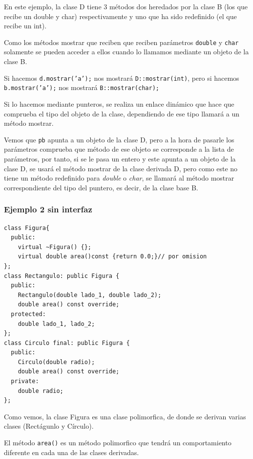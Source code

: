 En este ejemplo, la clase D tiene 3 métodos dos heredados por la clase B (los que recibe un double y char) respectivamente y uno que ha sido redefinido (el que recibe un int).

Como los métodos mostrar que reciben que reciben parámetros \texttt{double}  y \texttt{char} solamente se pueden acceder a ellos cuando lo llamamos mediante un objeto de la clase B.

Si hacemos \texttt{d.mostrar('a');} nos mostrará \texttt{D::mostrar(int)}, pero si hacemos \texttt{b.mostrar(’a’);} nos mostrará \texttt{B::mostrar(char);} 

Si lo hacemos mediante punteros, se realiza un enlace dinámico que hace que comprueba el tipo del objeto de la clase, dependiendo de ese tipo llamará a un método mostrar.

Vemos que \texttt{pb} apunta a un objeto de la clase D, pero a la hora de pasarle los parámetros comprueba que método de ese objeto se corresponde a la lista de parámetros, por tanto, si se le pasa un entero y este apunta a un objeto de la clase D, se usará el método mostrar de la clase derivada D, pero como este no tiene un método redefinido para \textit{double} o \textit{char}, se llamará al método mostrar correspondiente del tipo del puntero, es decir, de la clase base B.

\subsubsection{Ejemplo 2 sin interfaz}

\begin{center}
	\begin{lstlisting}[frame=single]
class Figura{
  public:
	virtual ~Figura() {};
	virtual double area()const {return 0.0;}// por omision 
};
class Rectangulo: public Figura {
  public:
    Rectangulo(double lado_1, double lado_2);
    double area() const override;
  protected:
    double lado_1, lado_2;
};
class Circulo final: public Figura {
  public:
    Circulo(double radio);
    double area() const override;
  private:
    double radio;
};		
	\end{lstlisting}
\end{center}

Como vemos, la clase Figura es una clase polimorfica, de donde se derivan varias clases (Rectágunlo y Círculo).

El método \texttt{area()} es un método polimorfico que tendrá un comportamiento diferente en cada una de las clases derivadas.

